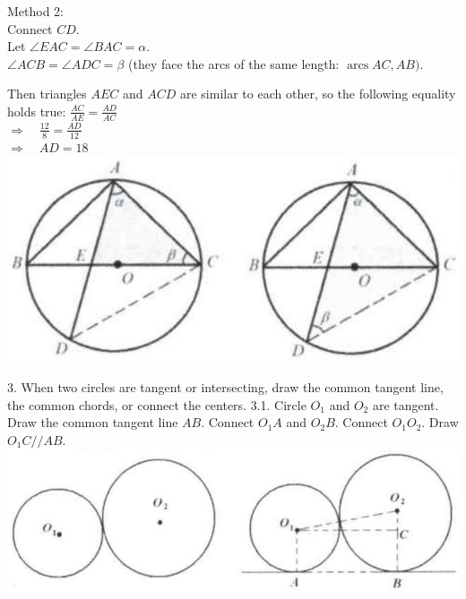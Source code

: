 \documentclass[10pt]{article}
\begin{document}
Method 2:\\
Connect \(C D\).\\
Let \(\angle E A C=\angle B A C=\alpha\).\\
\(\angle A C B=\angle A D C=\beta\) (they face the arcs of the same length: \(\operatorname{arcs} A C, A B)\).

Then triangles \(A E C\) and \(A C D\) are similar to each other, so the following equality holds true: \(\frac{A C}{A E}=\frac{A D}{A C}\)\\
\(\Rightarrow \quad \frac{12}{8}=\frac{A D}{12}\)\\
\(\Rightarrow \quad A D=18\)\\
\includegraphics[max width=\textwidth, center]{2025_04_17_97bc1f7e44d93c271a88g-174(1)}


3. When two circles are tangent or intersecting, draw the common tangent line, the common chords, or connect the centers.
3.1. Circle \(O_{1}\) and \(O_{2}\) are tangent. Draw the common tangent line \(A B\). Connect \(O_{1} A\) and \(O_{2} B\). Connect \(O_{1} O_{2}\). Draw \(O_{1} C / / A B\).\\
\includegraphics[max width=\textwidth, center]{2025_04_17_97bc1f7e44d93c271a88g-175(1)}
\end{document}
